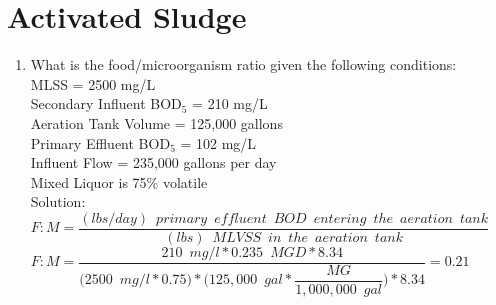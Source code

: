 \section{Activated Sludge}
\begin{enumerate}

\item What is the food/microorganism ratio given the following conditions:\\
MLSS = 2500 mg/L\\
Secondary Influent BOD$_5$ = 210 mg/L\\
Aeration Tank Volume = 125,000 gallons\\
Primary Effluent BOD$_5$ = 102 mg/L\\
Influent Flow = 235,000 gallons per day\\
Mixed Liquor is 75\% volatile\\

Solution:\\
\vspace{0.3cm}
$F:M=\dfrac{(lbs/day) \enspace primary \enspace effluent  \enspace BOD \enspace entering \enspace the  \enspace aeration \enspace tank}{(lbs) \enspace MLVSS \enspace in \enspace the  \enspace aeration \enspace tank}$\\
\vspace{0.3cm}
$F:M=\dfrac{210 \enspace mg/l*0.235 \enspace MGD*8.34}{\big(2500 \enspace mg/l*0.75\big)*\bigg(125,000 \enspace gal*\dfrac{MG}{1,000,000 \enspace gal}\bigg)*8.34}=\boxed{0.21}$\\


\end{enumerate}
